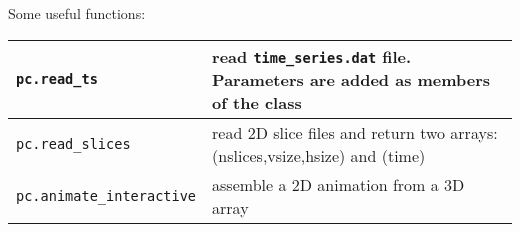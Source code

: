 \documentclass[a4paper,12pt]{article}
\begin{document}
Some useful functions:
\begin{center}
\begin{tabular}{|l|l|}\hline
\verb|pc.read_ts| & read \verb|time_series.dat| file. Parameters are added as members of the class\\\hline
\verb|pc.read_slices| & read 2D slice files and return two arrays: (nslices,vsize,hsize) and (time)\\\hline
\verb|pc.animate_interactive| & assemble a 2D animation from a 3D array\\\hline
\end{tabular}
\end{center}


% 
\end{document}
